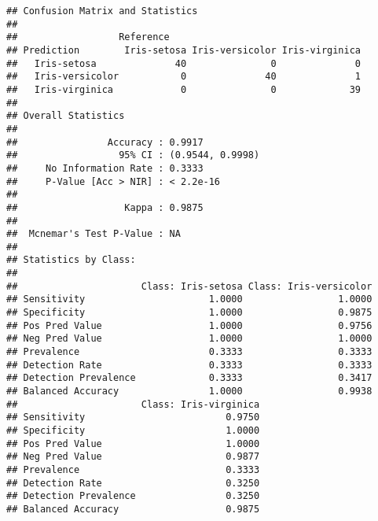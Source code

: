 \documentclass[]{article}
\newenvironment{Shaded}{\begin{snugshade}}{\end{snugshade}}
\newcommand{\KeywordTok}[1]{\textcolor[rgb]{0.13,0.29,0.53}{\textbf{#1}}}
\newcommand{\OperatorTok}[1]{\textcolor[rgb]{0.81,0.36,0.00}{\textbf{#1}}}
\newcommand{\NormalTok}[1]{#1}
\begin{document}
\begin{verbatim}
## Confusion Matrix and Statistics
## 
##                  Reference
## Prediction        Iris-setosa Iris-versicolor Iris-virginica
##   Iris-setosa              40               0              0
##   Iris-versicolor           0              40              1
##   Iris-virginica            0               0             39
## 
## Overall Statistics
##                                           
##                Accuracy : 0.9917          
##                  95% CI : (0.9544, 0.9998)
##     No Information Rate : 0.3333          
##     P-Value [Acc > NIR] : < 2.2e-16       
##                                           
##                   Kappa : 0.9875          
##                                           
##  Mcnemar's Test P-Value : NA              
## 
## Statistics by Class:
## 
##                      Class: Iris-setosa Class: Iris-versicolor
## Sensitivity                      1.0000                 1.0000
## Specificity                      1.0000                 0.9875
## Pos Pred Value                   1.0000                 0.9756
## Neg Pred Value                   1.0000                 1.0000
## Prevalence                       0.3333                 0.3333
## Detection Rate                   0.3333                 0.3333
## Detection Prevalence             0.3333                 0.3417
## Balanced Accuracy                1.0000                 0.9938
##                      Class: Iris-virginica
## Sensitivity                         0.9750
## Specificity                         1.0000
## Pos Pred Value                      1.0000
## Neg Pred Value                      0.9877
## Prevalence                          0.3333
## Detection Rate                      0.3250
## Detection Prevalence                0.3250
## Balanced Accuracy                   0.9875
\end{verbatim}

\begin{Shaded}
\end{Shaded}
\end{document}
